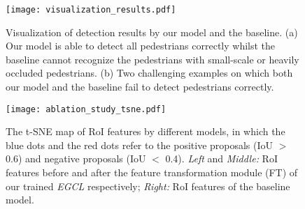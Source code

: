 \documentclass[journal]{IEEEtran}
\newcommand{\lincomment}[1]{\textcolor[rgb]{1,0,1} {#1}}
\begin{document}
\begin{comment}
\subsubsection{Effect of the exemplar dictionary on heavy-occluded subsets}
\lincomment{Detecting the heavy-occluded pedestrians is a critical challenge in the field of pedestrian detection. Due to the construction of exemplar dictionary, our model can spare much capacity to deal with the appearance diversities of pedestrians. Thus, the distribution of the exemplar dictionary determines the bias of our contrastive learning model. 
However, after we visualize all the exemplars in the constructed exemplar dictionary, we observe that the Reasonable samples account for about $80$\% of the exemplar dictionary that is consistent with the distribution of pedestrians in real-world scenarios. This phenomenon makes our model unable to deal with heavy-occluded pedestrians well.  
To investigate the effect of the exemplar dictionary on heavy-occluded subsets, we conduct experiment by increasing the occluded samples in the exemplar dictionary by simply replicating the existing occluded exemplars. As shown in Table \ref{tab:effect_occluded_ratio}, for CityPersons dataset, the performance of our model on \textbf{HO} and \textbf{R+HO} is indeed improved as the increase of the occluded exemplars, which demonstrates that our contrastive learning model is able to effectively handle occlusion of pedestrians. However, too large ratio of occluded exemplars would degrade the performance on \textbf{R} subset.}
\end{comment}

\begin{figure*}[!t]
\centering
    \texttt{[image: visualization\_results.pdf]}
\caption{Visualization of detection results by our model and the baseline. (a) Our model is able to detect all pedestrians correctly whilst the baseline cannot recognize the pedestrians with small-scale or heavily occluded pedestrians. (b) Two challenging examples on which both our model and the baseline fail to detect pedestrians correctly.}
\label{Fig:visualization_results}
\end{figure*}
\begin{figure}[!t]
\centering
    \texttt{[image: ablation\_study\_tsne.pdf]}
\caption{The t-SNE map of RoI features by different models, in which the blue dots and the red dots refer to the positive proposals (IoU $>$ 0.6) and negative proposals (IoU $<$ 0.4). \emph{Left} and \emph{Middle:} RoI features before and after the feature transformation module (FT) of our trained \emph{EGCL} respectively; \emph{Right:} RoI features of the baseline model.} 
\label{Fig:ped_back_tsne}
\end{figure}
\end{document}

